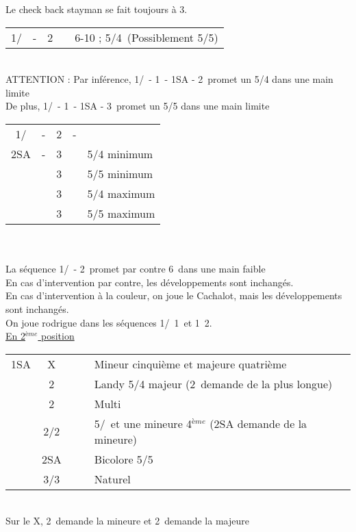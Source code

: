 \documentclass[a4paper, oneside, 11pt]{report}
\begin{document}
		Le check back stayman se fait toujours à 3\trefle.\\

		\begin{tabular}{cccc|l}
		1\trefle/\carreau & - & 2\coeur && 6-10 ; 5\pique/4\coeur\ (Possiblement 5/5)\\
		\end{tabular}\\
		ATTENTION : Par inférence, 1\trefle/\carreau\ - 1\pique\ - 1SA - 2\coeur\ promet un 5/4 dans une main limite\\
		De plus, 1\trefle/\carreau\ - 1\pique\ - 1SA - 3\coeur\ promet un 5/5 dans une main limite\\
	
		\begin{tabular}{cccc|l}
		1\trefle/\carreau & - & 2\coeur & - &\\
		2SA & - & 3\trefle && 5/4 minimum\\
		&& 3\carreau && 5/5 minimum\\
		&& 3\coeur && 5/4 maximum\\
		&& 3\pique && 5/5 maximum\\
		\end{tabular}\\\\
	
		La séquence 1\trefle/\carreau\ - 2\pique\ promet par contre 6\pique\ dans une main faible\\
		
		En cas d'intervention par contre, les développements sont inchangés.\\
		En cas d'intervention à la couleur, on joue le Cachalot, mais les développements sont inchangés.\\
		
		On joue rodrigue dans les séquences 1\trefle/\carreau\ 1\pique\ et 1\carreau\ 2\trefle.\\
	
	\underline{En 2$^{ème}$ position}
	
	\begin{tabular}{cccc|l}
	1SA & X &&& Mineur cinquième et majeure quatrième\\
	& 2\trefle &&& Landy 5/4 majeur (2\carreau\ demande de la plus longue)\\
	& 2\carreau &&& Multi\\
	& 2\coeur/2\pique &&& 5\coeur/\pique\ et une mineure 4$^{ème}$ (2SA demande de la mineure)\\
	& 2SA &&& Bicolore 5\trefle/5\carreau\\
	& 3\trefle/3\carreau &&& Naturel\\
	\end{tabular}\\
	Sur le X, 2\trefle\ demande la mineure et 2\carreau\ demande la majeure\\
	
\end{document}
